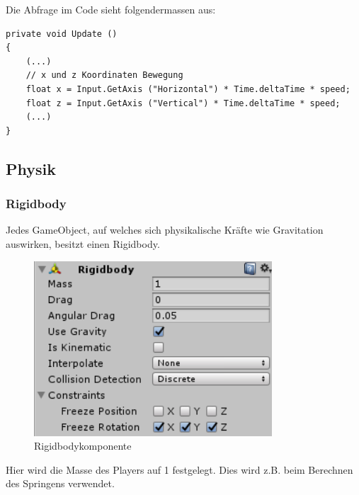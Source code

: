 Die Abfrage im Code sieht folgendermassen aus:

\begin{lstlisting}[caption={Abfrage der X- und Z-Achsen im Code}]
private void Update ()
{
	(...)
	// x und z Koordinaten Bewegung
	float x = Input.GetAxis ("Horizontal") * Time.deltaTime * speed;
	float z = Input.GetAxis ("Vertical") * Time.deltaTime * speed;
	(...)
}      
\end{lstlisting}

\subsection{Physik}

\subsubsection{Rigidbody}
Jedes GameObject, auf welches sich physikalische Kräfte wie Gravitation auswirken, besitzt einen Rigidbody.
\begin{figure}[H]
\includegraphics[scale=0.8]{screenshots/rigidbody.png}
\caption{Rigidbodykomponente}
\end{figure}
Hier wird die Masse des Players auf 1 festgelegt. Dies wird z.B. beim Berechnen des Springens verwendet.

